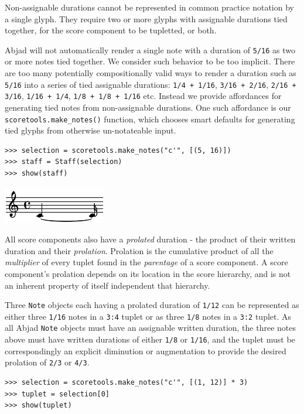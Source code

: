 Non-assignable durations cannot be represented in common practice notation by a
single glyph. They require two or more glyphs with assignable durations tied
together, for the score component to be tupletted, or both.

Abjad will not automatically render a single note with a duration of
\texttt{5/16} as two or more notes tied together. We consider such behavior to
be too implicit. There are too many potentially compositionally valid ways to
render a duration such as \texttt{5/16} into a series of tied assignable
durations: \texttt{1/4 + 1/16}, \texttt{3/16 + 2/16}, \texttt{2/16 + 3/16},
\texttt{1/16 + 1/4}, \texttt{1/8 + 1/8 + 1/16} etc. Instead we provide
affordances for generating tied notes from non-assignable durations. One such
affordance is our \texttt{scoretools.make\_notes()} function, which chooses
smart defaults for generating tied glyphs from otherwise un-notateable input.

\begin{lstlisting}
>>> selection = scoretools.make_notes("c'", [(5, 16)])
>>> staff = Staff(selection)
>>> show(staff)
\end{lstlisting}

\includegraphics[scale=1.0]{images/section_2_notational_isomorphism-3.pdf}


All score components also have a \emph{prolated} duration - the product of
their written duration and their \emph{prolation}. Prolation is the cumulative
product of all the \emph{multiplier} of every tuplet found in the
\emph{parentage} of a score component. A score component's prolation depends on
its location in the score hierarchy, and is not an inherent property of itself
independent that hierarchy.

Three \texttt{Note} objects each having a prolated duration of \texttt{1/12}
can be represented as either three \texttt{1/16} notes in a \texttt{3:4} tuplet
or as three \texttt{1/8} notes in a \texttt{3:2} tuplet. As all Abjad
\texttt{Note} objects must have an assignable written duration, the three notes
above must have written durations of either \texttt{1/8} or \texttt{1/16}, and
the tuplet must be correspondingly an explicit diminution or augmentation to
provide the desired prolation of \texttt{2/3} or \texttt{4/3}.

\begin{lstlisting}
>>> selection = scoretools.make_notes("c'", [(1, 12)] * 3)
>>> tuplet = selection[0]
>>> show(tuplet)
\end{lstlisting}

